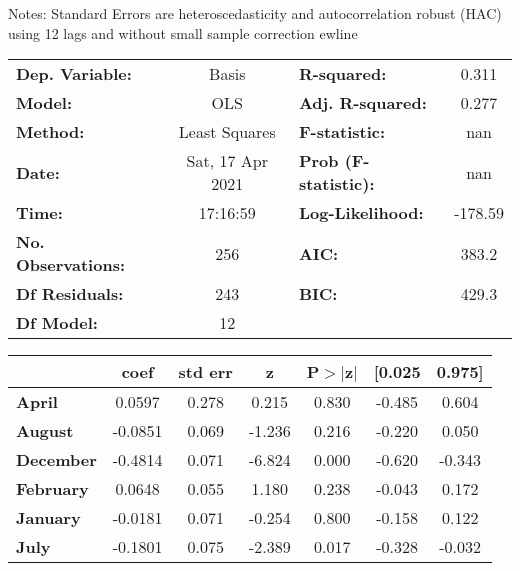 Notes: \newline
 [1] Standard Errors are heteroscedasticity and autocorrelation robust (HAC) using 12 lags and without small sample correction
ewline\begin{center}
\begin{tabular}{lclc}
\toprule
\textbf{Dep. Variable:}    &      Basis       & \textbf{  R-squared:         } &     0.311   \\
\textbf{Model:}            &       OLS        & \textbf{  Adj. R-squared:    } &     0.277   \\
\textbf{Method:}           &  Least Squares   & \textbf{  F-statistic:       } &       nan   \\
\textbf{Date:}             & Sat, 17 Apr 2021 & \textbf{  Prob (F-statistic):} &      nan    \\
\textbf{Time:}             &     17:16:59     & \textbf{  Log-Likelihood:    } &   -178.59   \\
\textbf{No. Observations:} &         256      & \textbf{  AIC:               } &     383.2   \\
\textbf{Df Residuals:}     &         243      & \textbf{  BIC:               } &     429.3   \\
\textbf{Df Model:}         &          12      & \textbf{                     } &             \\
\bottomrule
\end{tabular}
\begin{tabular}{lcccccc}
                   & \textbf{coef} & \textbf{std err} & \textbf{z} & \textbf{P$> |$z$|$} & \textbf{[0.025} & \textbf{0.975]}  \\
\midrule
\textbf{April}     &       0.0597  &        0.278     &     0.215  &         0.830        &       -0.485    &        0.604     \\
\textbf{August}    &      -0.0851  &        0.069     &    -1.236  &         0.216        &       -0.220    &        0.050     \\
\textbf{December}  &      -0.4814  &        0.071     &    -6.824  &         0.000        &       -0.620    &       -0.343     \\
\textbf{February}  &       0.0648  &        0.055     &     1.180  &         0.238        &       -0.043    &        0.172     \\
\textbf{January}   &      -0.0181  &        0.071     &    -0.254  &         0.800        &       -0.158    &        0.122     \\
\textbf{July}      &      -0.1801  &        0.075     &    -2.389  &         0.017        &       -0.328    &       -0.032     \\

\end{tabular}
\end{center}

